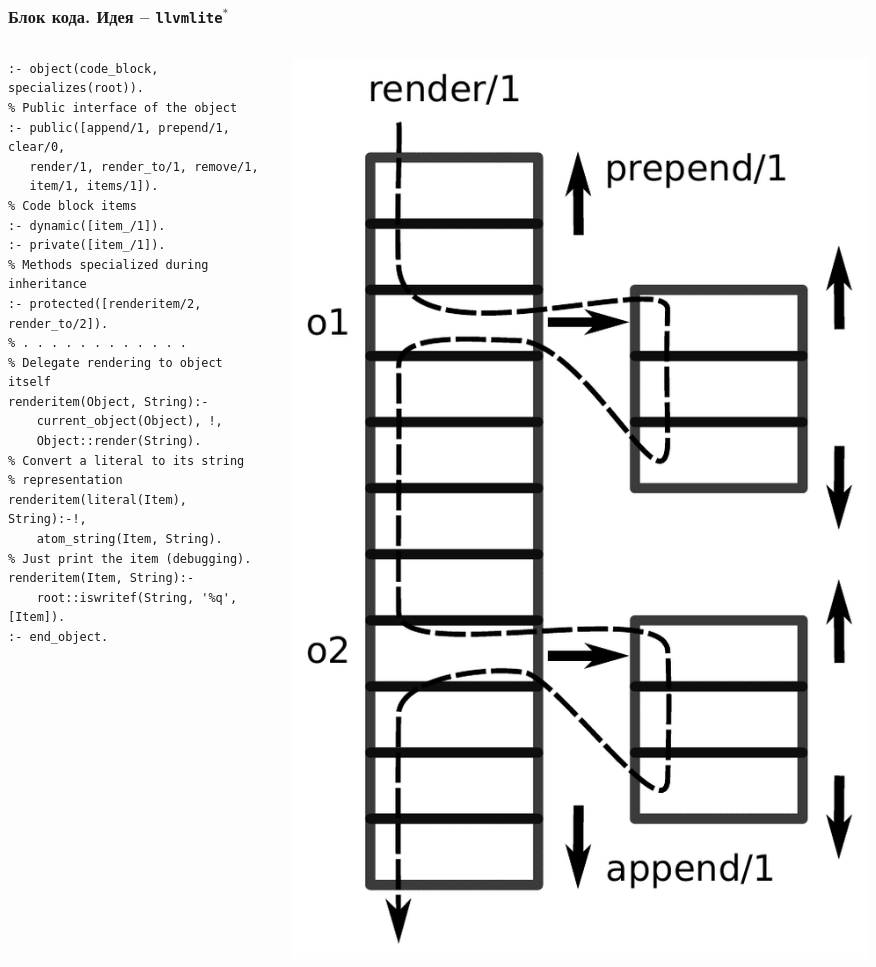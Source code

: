 \documentclass[10pt]{beamer}
\begin{document}
\begin{frame}[fragile]
  \frametitle{Блок кода. Идея -- \texttt{llvmlite}${}^*$}
  \begin{columns}
    \begin{column}{0.6\textwidth}
      \flushleft
\begin{verbatim}
:- object(code_block, specializes(root)).
% Public interface of the object
:- public([append/1, prepend/1, clear/0,
   render/1, render_to/1, remove/1,
   item/1, items/1]).
% Code block items
:- dynamic([item_/1]).
:- private([item_/1]).
% Methods specialized during inheritance
:- protected([renderitem/2, render_to/2]).
% . . . . . . . . . . . .
% Delegate rendering to object itself
renderitem(Object, String):-
    current_object(Object), !,
    Object::render(String).
% Convert a literal to its string
% representation
renderitem(literal(Item), String):-!,
    atom_string(Item, String).
% Just print the item (debugging).
renderitem(Item, String):-
    root::iswritef(String, '%q', [Item]).
:- end_object.
\end{verbatim}
    \end{column}
    \begin{column}{0.4\textwidth}
      \includegraphics[width=1\linewidth]{code_block.pdf}

\end{column}
\end{columns}
\end{frame}
\end{document}

